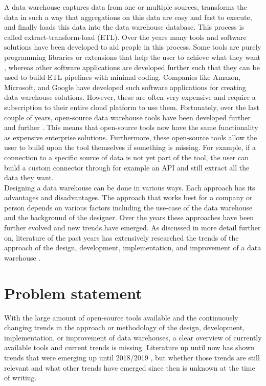 \documentclass[11pt]{article}
\begin{document}
A data warehouse captures data from one or multiple sources, transforms the data in such a way that aggregations on this data are easy and fast to execute, and finally loads this data into the data warehouse database. This process is called extract-transform-load (ETL). Over the years many tools and software solutions have been developed to aid people in this process. Some tools are purely programming libraries or extensions that help the user to achieve what they want \cite{Thomsen201821, Jensen202145, Biswas_programming2019267}, whereas other software applications are developed further such that they can be used to build ETL pipelines with minimal coding. Companies like Amazon, Microsoft, and Google have developed such software applications for creating data warehouse solutions. However, these are often very expensive and require a subscription to their entire cloud platform to use them. Fortunately, over the last couple of years, open-source data warehouse tools have been developed further and further \cite{nejres2015analysis}. This means that open-source tools now have the same functionality as expensive enterprise solutions. Furthermore, these open-source tools allow the user to build upon the tool themselves if something is missing. For example, if a connection to a specific source of data is not yet part of the tool, the user can build a custom connector through for example an API and still extract all the data they want. \\

Designing a data warehouse can be done in various ways. Each approach has its advantages and disadvantages. The approach that works best for a company or person depends on various factors including the use-case of the data warehouse and the background of the designer. Over the years these approaches have been further evolved and new trends have emerged. As discussed in more detail further on, literature of the past years has extensively researched the trends of the approach of the design, development, implementation, and improvement of a data warehouse \cite{costa2018evaluating, kozmina2018information, golfarelli2017star, chandra2018comprehensive}. \\

\section{Problem statement}
With the large amount of open-source tools available and the continuously changing trends in the approach or methodology of the design, development, implementation, or improvement of data warehouses, a clear overview of currently available tools and current trends is missing. Literature up until now has shown trends that were emerging up until 2018/2019 \cite{costa2018evaluating, kozmina2018information, golfarelli2017star, chandra2018comprehensive}, but whether those trends are still relevant and what other trends have emerged since then is unknown at the time of writing. 
\end{document}
